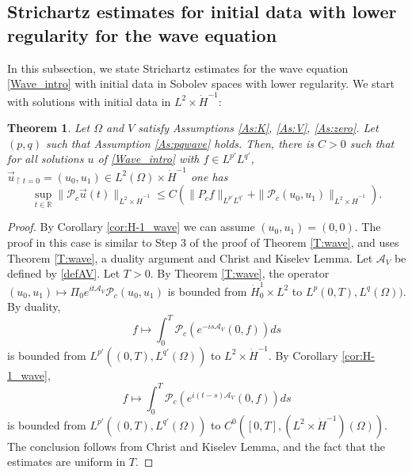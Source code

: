 \documentclass[10pt,leqno]{amsart}
\newtheorem{theorem}{Theorem}[section]
\theoremstyle{definition}%
\theoremstyle{remark}
\numberwithin{equation}{section}
\newcommand{\R}{\mathbb{R}}
\renewcommand{\^}{\widehat}%
\newcommand{\AAA}{\mathcal{A}}
\newcommand{\PPP}{\mathcal{P}}
\begin{document}
\subsection{Strichartz estimates for initial data with lower regularity for the wave equation}
\label{AA:lower}
In this subsection, we state Strichartz estimates for the wave equation \eqref{Wave_intro} with initial data in Sobolev spaces with lower regularity. We start with solutions with initial data in $L^2\times \dot{H}^{-1}$:
\begin{theorem}
 \label{T:Strichartz_H-1}
 Let $\Omega$ and $V$ satisfy Assumptions \ref{As:K}, \ref{As:V}, \ref{As:zero}. Let $(p,q)$ such that Assumption \ref{As:pqwave} holds. Then, there is $C>0$ such that for all solutions $u$ of \eqref{Wave_intro} with $f\in  L^{p'} L^{q'}$, $\vec{u}_{\restriction t=0}=(u_0,u_1)\in L^2(\Omega)\times \dot{H}^{-1}$ 
 one has 
$$\sup_{t\in \R}\|\PPP_c\vec{u}(t)\|_{L^2\times \dot{H}^{-1}}\leq C\left( \|P_c f\|_{L^{p'}L^{q'}}+\|\PPP_c(u_0,u_1)\|_{L^2\times \dot{H}^{-1}}\right).$$
 \end{theorem}
 \begin{proof}
 By Corollary \ref{cor:H-1_wave} we can assume $(u_0,u_1)=(0,0)$.
  The proof in this case is similar to Step 3 of the proof of Theorem \ref{T:wave}, and uses Theorem \ref{T:wave}, a duality argument and Christ and Kiselev Lemma. Let $\mathcal{A}_V$ be defined by \eqref{defAV}.
Let $T>0$.
By Theorem \ref{T:wave}, the operator $(u_0,u_1)\mapsto \Pi_0 e^{it\AAA_V}\PPP_c(u_0,u_1)$ is bounded from $\dot{H}^{1}_0\times L^2$ to $L^p(0,T),L^q(\Omega))$. By duality,
$$f\mapsto\int_0^T \PPP_c\left(e^{-is\AAA_V} (0,f)\right)ds$$
is bounded from $L^{p'}((0,T),L^{q'}(\Omega))$ to $L^2\times \dot{H}^{-1}$. By Corollary \ref{cor:H-1_wave},
$$f \mapsto \int_0^{T}\PPP_c\left(e^{i(t-s)\AAA_V} (0,f)\right)ds $$
is bounded from $L^{p'}((0,T),L^{q'}(\Omega))$ to $C^0\left([0,T],(L^2\times \dot{H}^{-1})(\Omega)\right)$. The conclusion follows from Christ and Kiselev Lemma, and the fact that the estimates are uniform in $T$.
 \end{proof}
\end{document}
